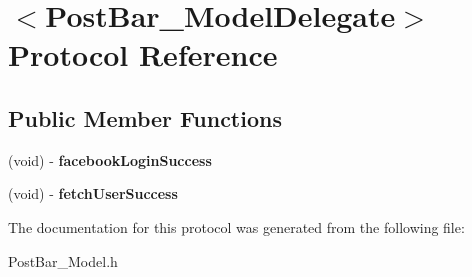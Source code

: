 \hypertarget{protocol_post_bar___model_delegate-p}{
\section{$<$PostBar\_\-ModelDelegate$>$ Protocol Reference}
\label{protocol_post_bar___model_delegate-p}
}
\subsection*{Public Member Functions}
\begin{DoxyCompactItemize}
\item 
\hypertarget{protocol_post_bar___model_delegate-p_a85dbb527e621502974f4ba04ba4c6933}{
(void) -\/ {\bfseries facebookLoginSuccess}}
\label{protocol_post_bar___model_delegate-p_a85dbb527e621502974f4ba04ba4c6933}

\item 
\hypertarget{protocol_post_bar___model_delegate-p_a2d3f90a58a7bbfa3bf07e51ddfdf8991}{
(void) -\/ {\bfseries fetchUserSuccess}}
\label{protocol_post_bar___model_delegate-p_a2d3f90a58a7bbfa3bf07e51ddfdf8991}

\end{DoxyCompactItemize}


The documentation for this protocol was generated from the following file:\begin{DoxyCompactItemize}
\item 
PostBar\_\-Model.h\end{DoxyCompactItemize}
